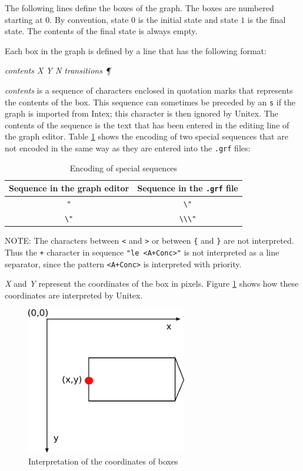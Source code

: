 \bigskip
\noindent The following lines define the boxes of the graph. The boxes are numbered
starting at $0$. By convention, state $0$ is the initial state and state $1$ is
the final state. The contents of the final state is always empty.

\bigskip
\noindent Each box in the graph is defined by a line that has the
following format:

\bigskip
\textit{contents X Y N transitions \P}

\bigskip
\noindent \textit{contents} is a sequence of characters enclosed in quotation
marks that represents the contents of the box. This sequence can sometimes be
preceded by an \verb+s+ if the graph is imported from Intex; this character is
then ignored by Unitex. The contents of the sequence is the text that has been
entered in the editing line of the graph editor. Table \ref{table10-2} shows the
encoding of two special sequences that are not encoded in the same way as they
are entered into the \verb+.grf+ files:

\bigskip
\begin{table}[h]
\begin{center}
\begin{tabular}{|c|c|}
\hline
Sequence in the graph editor & Sequence in the \verb+.grf+ file
\\
\hline
\verb$"$ & \verb$\"$
\\
\hline
\verb$\"$ & \verb$\\\"$
\\
\hline
\end{tabular}
\caption{Encoding of special sequences\label{table10-2}}
\end{center}
\end{table}

\bigskip
\noindent NOTE: The characters between \verb+<+ and \verb+>+ or between \verb+{+
and \verb+}+ are not interpreted. Thus the \verb$+$ character in sequence
\verb$"le <A+Conc>"$ is not interpreted as a line separator, since the pattern
\verb$<A+Conc>$ is interpreted with priority.

\bigskip
\noindent \textit{X} and \textit{Y} represent the coordinates of the box in
pixels. Figure
\ref{fig-box-coordinates} shows how these coordinates are interpreted by Unitex.

\begin{figure}[!h]
\begin{center}
\includegraphics[width=7cm]{resources/img/repere.png}
\caption{Interpretation of the coordinates of boxes\label{fig-box-coordinates}}
\end{center}
\end{figure}

